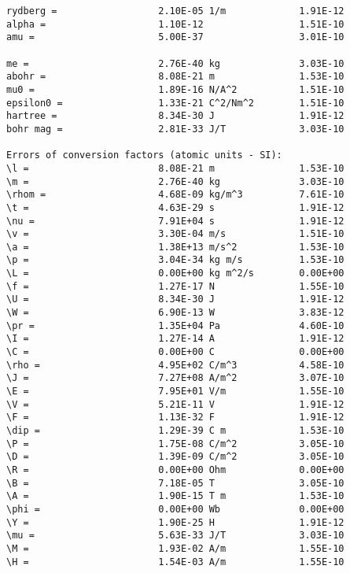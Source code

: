 \documentclass[12pt,a4paper,twoside]{report}
\begin{document}
{\begin{tcolorbox}
\begin{verbatim}
rydberg =                  2.10E-05 1/m             1.91E-12
alpha =                    1.10E-12                 1.51E-10
amu =                      5.00E-37                 3.01E-10

me =                       2.76E-40 kg              3.03E-10
abohr =                    8.08E-21 m               1.53E-10
mu0 =                      1.89E-16 N/A^2           1.51E-10
epsilon0 =                 1.33E-21 C^2/Nm^2        1.51E-10
hartree =                  8.34E-30 J               1.91E-12
bohr mag =                 2.81E-33 J/T             3.03E-10

Errors of conversion factors (atomic units - SI):
\l =                       8.08E-21 m               1.53E-10
\m =                       2.76E-40 kg              3.03E-10
\rhom =                    4.68E-09 kg/m^3          7.61E-10
\t =                       4.63E-29 s               1.91E-12
\nu =                      7.91E+04 s               1.91E-12
\v =                       3.30E-04 m/s             1.51E-10
\a =                       1.38E+13 m/s^2           1.53E-10
\p =                       3.04E-34 kg m/s          1.53E-10
\L =                       0.00E+00 kg m^2/s        0.00E+00
\f =                       1.27E-17 N               1.55E-10
\U =                       8.34E-30 J               1.91E-12
\W =                       6.90E-13 W               3.83E-12
\pr =                      1.35E+04 Pa              4.60E-10
\I =                       1.27E-14 A               1.91E-12
\C =                       0.00E+00 C               0.00E+00
\rho =                     4.95E+02 C/m^3           4.58E-10
\J =                       7.27E+08 A/m^2           3.07E-10
\E =                       7.95E+01 V/m             1.55E-10
\V =                       5.21E-11 V               1.91E-12
\F =                       1.13E-32 F               1.91E-12
\dip =                     1.29E-39 C m             1.53E-10
\P =                       1.75E-08 C/m^2           3.05E-10
\D =                       1.39E-09 C/m^2           3.05E-10
\R =                       0.00E+00 Ohm             0.00E+00
\B =                       7.18E-05 T               3.05E-10
\A =                       1.90E-15 T m             1.53E-10
\phi =                     0.00E+00 Wb              0.00E+00
\Y =                       1.90E-25 H               1.91E-12
\mu =                      5.63E-33 J/T             3.03E-10
\M =                       1.93E-02 A/m             1.55E-10
\H =                       1.54E-03 A/m             1.55E-10


\end{verbatim}
\end{tcolorbox}}
\end{document}
